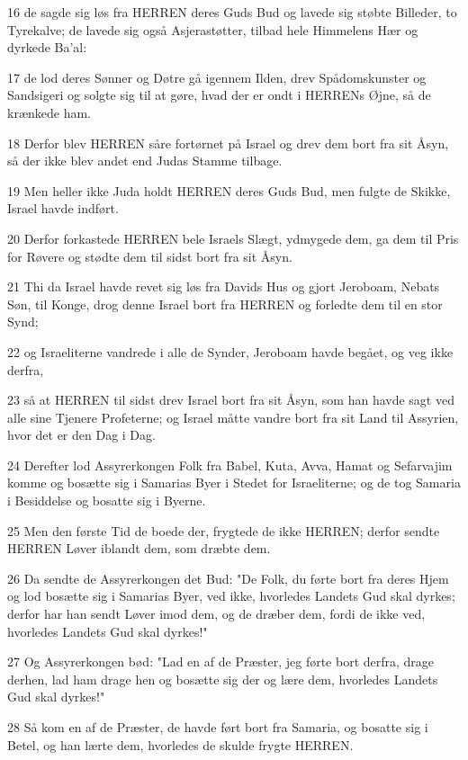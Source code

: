 \par 16 de sagde sig løs fra HERREN deres Guds Bud og lavede sig støbte Billeder, to Tyrekalve; de lavede sig også Asjerastøtter, tilbad hele Himmelens Hær og dyrkede Ba'al:
\par 17 de lod deres Sønner og Døtre gå igennem Ilden, drev Spådomskunster og Sandsigeri og solgte sig til at gøre, hvad der er ondt i HERRENs Øjne, så de krænkede ham.
\par 18 Derfor blev HERREN såre fortørnet på Israel og drev dem bort fra sit Åsyn, så der ikke blev andet end Judas Stamme tilbage.
\par 19 Men heller ikke Juda holdt HERREN deres Guds Bud, men fulgte de Skikke, Israel havde indført.
\par 20 Derfor forkastede HERREN bele Israels Slægt, ydmygede dem, ga dem til Pris for Røvere og stødte dem til sidst bort fra sit Åsyn.
\par 21 Thi da Israel havde revet sig løs fra Davids Hus og gjort Jeroboam, Nebats Søn, til Konge, drog denne Israel bort fra HERREN og forledte dem til en stor Synd;
\par 22 og Israeliterne vandrede i alle de Synder, Jeroboam havde begået, og veg ikke derfra,
\par 23 så at HERREN til sidst drev Israel bort fra sit Åsyn, som han havde sagt ved alle sine Tjenere Profeterne; og Israel måtte vandre bort fra sit Land til Assyrien, hvor det er den Dag i Dag.
\par 24 Derefter lod Assyrerkongen Folk fra Babel, Kuta, Avva, Hamat og Sefarvajim komme og bosætte sig i Samarias Byer i Stedet for Israeliterne; og de tog Samaria i Besiddelse og bosatte sig i Byerne.
\par 25 Men den første Tid de boede der, frygtede de ikke HERREN; derfor sendte HERREN Løver iblandt dem, som dræbte dem.
\par 26 Da sendte de Assyrerkongen det Bud: "De Folk, du førte bort fra deres Hjem og lod bosætte sig i Samarias Byer, ved ikke, hvorledes Landets Gud skal dyrkes; derfor har han sendt Løver imod dem, og de dræber dem, fordi de ikke ved, hvorledes Landets Gud skal dyrkes!"
\par 27 Og Assyrerkongen bød: "Lad en af de Præster, jeg førte bort derfra, drage derhen, lad ham drage hen og bosætte sig der og lære dem, hvorledes Landets Gud skal dyrkes!"
\par 28 Så kom en af de Præster, de havde ført bort fra Samaria, og bosatte sig i Betel, og han lærte dem, hvorledes de skulde frygte HERREN.
